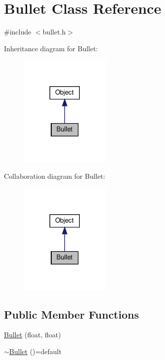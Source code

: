 \hypertarget{classBullet}{}\section{Bullet Class Reference}
\label{classBullet}


{\ttfamily \#include $<$bullet.\+h$>$}



Inheritance diagram for Bullet\+:\nopagebreak
\begin{figure}[H]
\begin{center}
\leavevmode
\includegraphics[width=125pt]{classBullet__inherit__graph}
\end{center}
\end{figure}


Collaboration diagram for Bullet\+:\nopagebreak
\begin{figure}[H]
\begin{center}
\leavevmode
\includegraphics[width=125pt]{classBullet__coll__graph}
\end{center}
\end{figure}
\subsection*{Public Member Functions}
\begin{DoxyCompactItemize}
\item 
\hyperlink{classBullet_a5d934d668d3335e10f87302190608f57}{Bullet} (float, float)
\item 
\hyperlink{classBullet_a9e4f14ca4d33ad9445f13610135aa1f1}{$\sim$\+Bullet} ()=default
\end{DoxyCompactItemize}
